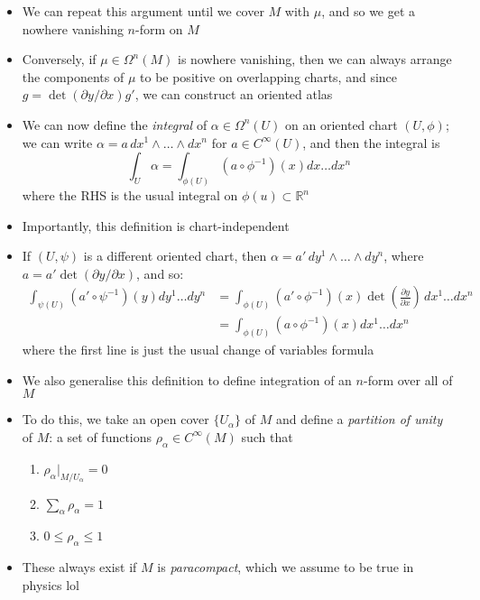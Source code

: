 \documentclass[12pt,a4paper]{article}
\numberwithin{equation}{section}
\begin{document}
\begin{itemize}
		\item We can repeat this argument until we cover $M$ with $\mu$, and so we get a nowhere vanishing $n$-form on $M$
		\item Conversely, if $\mu\in\Omega^{n}(M)$ is nowhere vanishing, then we can always arrange the components of $\mu$ to be positive on overlapping charts, and since $g=\det(\partial y/\partial x)g'$, we can construct an oriented atlas
		\item We can now define the \textit{integral} of $\alpha\in\Omega^{n}(U)$ on an oriented chart $(U,\phi)$; we can write $\alpha=a\,dx^{1}\wedge\ldots\wedge dx^{n}$ for $a\in C^{\infty}(U)$, and then the integral is
		\begin{equation}
			\int_{U}\alpha=\int_{\phi(U)}(a\circ\phi^{-1})(x)dx\ldots dx^{n}
		\end{equation}
		where the RHS is the usual integral on $\phi(u)\subset \mathbb{R}^{n}$ 
		\item Importantly, this definition is chart-independent
		\item If $(U,\psi)$ is a different oriented chart, then $\alpha =a'\,dy^{1}\wedge\ldots\wedge dy^{n}$, where $a=a'\det(\partial y/\partial x)$, and so:
		\begin{equation}
			\begin{aligned}
				\int_{\psi(U)}(a'\circ\psi^{-1})(y)dy^{1}\ldots dy^{n}&=\int_{\phi(U)}(a'\circ\phi^{-1})(x)\det\left(\frac{\partial y}{\partial x}\right)\,dx^{1}\ldots dx^{n}\\&=\int_{\phi(U)}(a\circ \phi^{-1})(x)dx^{1}\ldots dx^{n}
			\end{aligned}
		\end{equation}
		where the first line is just the usual change of variables formula
		\item We also generalise this definition to define integration of an $n$-form over all of $M$
		\item To do this, we take an open cover $\{U_{\alpha}\}$ of $M$ and define a \textit{partition of unity} of $M$: a set of functions $\rho_{\alpha}\in C^{\infty}(M)$ such that
		\begin{enumerate}
			\item $\rho_{\alpha}\rvert_{M/ U_{\alpha}}=0$
			\item $\sum_{\alpha}\rho_{\alpha}=1$
			\item $0\leq\rho_{\alpha}\leq 1$
		\end{enumerate}
		\item These always exist if $M$ is \textit{paracompact}, which we assume to be true in physics lol

\end{itemize}
\end{document}
